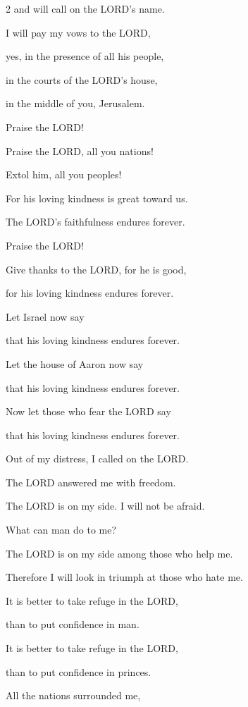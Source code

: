 \begin{multicols}{2}
	and will call on the LORD’s name.
	
	
	\myverse{}I will pay my vows to the LORD,
	
	yes, in the presence of all his people,
	
	
	\myverse{}in the courts of the LORD’s house,
	
	in the middle of you, Jerusalem.
	
	Praise the LORD!
	
	
	\mychapter{} \myverse*{}Praise the LORD, all you nations!
	
	\quad\quad\quad Extol him, all you peoples!
	
	
	\myverse{}For his loving kindness is great toward us.
	
	The LORD’s faithfulness endures forever.
	
	Praise the LORD!
	
	
	\mychapter{} \myverse*{}Give thanks to the LORD, for he is good,
	
	\quad\quad\quad for his loving kindness endures forever.
	
	
	\myverse{}Let Israel now say
	
	that his loving kindness endures forever.
	
	
	\myverse{}Let the house of Aaron now say
	
	that his loving kindness endures forever.
	
	
	\myverse{}Now let those who fear the LORD say
	
	that his loving kindness endures forever.
	
	
	\myverse{}Out of my distress, I called on the LORD.
	
	The LORD answered me with freedom.
	
	
	\myverse{}The LORD is on my side. I will not be afraid.
	
	What can man do to me?
	
	
	\myverse{}The LORD is on my side among those who help me.
	
	Therefore I will look in triumph at those who hate me.
	
	
	\myverse{}It is better to take refuge in the LORD,
	
	than to put confidence in man.
	
	
	\myverse{}It is better to take refuge in the LORD,
	
	than to put confidence in princes.
	
	
	\myverse{}All the nations surrounded me,
	

\end{multicols}
